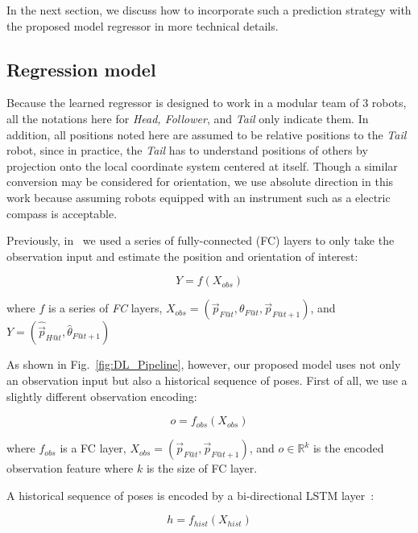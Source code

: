 \documentclass[letterpaper, 10 pt, conference]{ieeeconf}  %
\begin{document}
	In the next section, we discuss how to incorporate such a prediction strategy with
	the proposed model regressor in more technical details.


	\subsection{Regression model}
	\label{sec:regression_model}

	Because the learned regressor is designed to work in a modular team of $3$ robots,
	all the notations here for \emph{Head, Follower}, and \emph{Tail} only indicate
	them. In addition, all positions noted here are assumed to be relative positions
	to the \emph{Tail} robot, since in practice, the \emph{Tail} has to understand
	positions of others by projection onto the local coordinate system centered
	at itself. Though a similar conversion may be considered for orientation,
	we use absolute direction in this work because assuming robots equipped
	with an instrument such as a electric compass is acceptable.

	Previously, in~\cite{CPR17} we used a series of fully-connected (FC) layers
	to only take the observation input and estimate the position and orientation
	of interest:

	\begin{equation}
	Y = f(X_{obs})
	\end{equation}

	\begin{flushleft}
	where $f$ is a series of \emph{FC} layers,
	$X_{obs} = (\vec{p}_{F@t}, \theta_{F@t}, \vec{p}_{F@t+1})$, and
	$Y = (\hat{\vec{p}}_{H@t}, \hat{\theta}_{F@t+1})$
	\end{flushleft}

	As shown in Fig.~\ref{fig:DL_Pipeline}, however, our proposed model uses not only
	an observation input but also a historical sequence of poses. First of all, we
	use a slightly different observation encoding:

	\begin{equation}
	o = f_{obs}(X_{obs})
	\end{equation}

	where $f_{obs}$ is a FC layer,
		$X_{obs} = (\vec{p}_{F@t}, \vec{p}_{F@t+1})$,
		and $o \in \mathbb{R}^{k}$ is the encoded observation feature
		where $k$ is the size of FC layer.

	A historical sequence of poses is encoded by a bi-directional LSTM layer~\cite{Wu16}:

	\begin{equation}
	h = f_{hist}(X_{hist})
	\end{equation}
\end{document}
